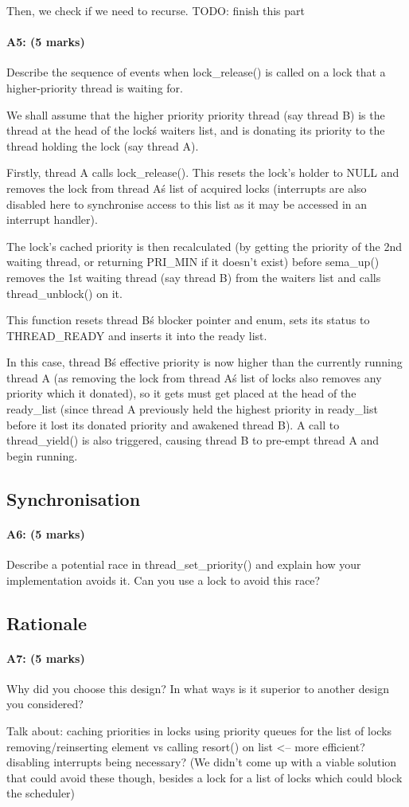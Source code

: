     Then, we check if we need to recurse. TODO: finish this part

\paragraph{A5: (5 marks)}
Describe the sequence of events when lock\_release() is called on a lock that a higher-priority thread is waiting for.

We shall assume that the higher priority priority thread (say thread B) is the thread at the head of the lock\'s waiters list, and is donating its priority to the thread holding the lock (say thread A).

Firstly, thread A calls lock\_release(). This resets the lock's holder to NULL and removes the lock from thread A\'s list of acquired locks (interrupts are also disabled here to synchronise access to this list as it may be accessed in an interrupt handler).

The lock's cached priority is then recalculated (by getting the priority of the 2nd waiting thread, or returning PRI\_MIN if it doesn't exist) before sema\_up() removes the 1st waiting thread (say thread B) from the waiters list and calls thread\_unblock() on it.

This function resets thread B\'s blocker pointer and enum, sets its status to THREAD\_READY and inserts it into the ready list.

In this case, thread B\'s effective priority is now higher than the currently running thread A (as removing the lock from thread A\'s list of locks also removes any priority which it donated), so it gets must get placed at the head of the ready\_list (since thread A previously held the highest priority in ready\_list before it lost its donated priority and awakened thread B). A call to thread\_yield() is also triggered, causing thread B to pre-empt thread A and begin running.

\subsection{Synchronisation}
\paragraph{A6: (5 marks)}
Describe a potential race in thread\_set\_priority() and explain how your implementation avoids it.  Can you use a lock to avoid this race?

\subsection{Rationale}
\paragraph{A7: (5 marks)}
Why did you choose this design?  In what ways is it superior to another design you considered?

Talk about:
	caching priorities in locks
	using priority queues for the list of locks
  removing/reinserting element vs calling resort() on list <-- more efficient?
	disabling interrupts being necessary? (We didn't come up with a viable solution that could avoid these though, besides a lock for a list of locks which could block the scheduler)
